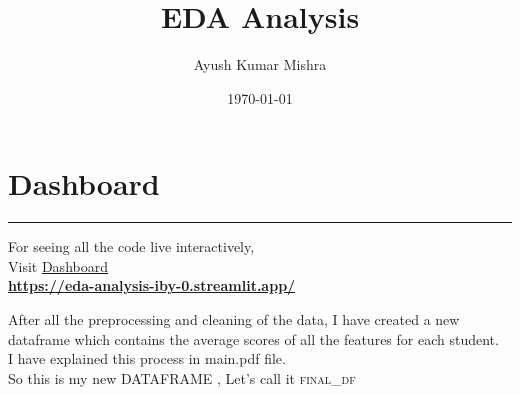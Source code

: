 \documentclass{article}
\title{\textcolor{primaryColor}{\Huge\textbf{EDA Analysis}}}
\author{\textcolor{secondaryColor}{\Large Ayush Kumar Mishra}}
\date{\textcolor{secondaryColor}{\today}}
\begin{document}
\maketitle

\newpage
\section*{Dashboard}
  \begin{center}
        \color{red}\rule{1\linewidth}{1mm}
    \end{center}
\begin{center}
\vspace{2in}
    {\Huge  For seeing all the code live interactively, \\
    \vspace{2in}
    Visit  \href{https://eda-analysis-iby-0.streamlit.app/}{Dashboard}}\\
    
    \vspace{0.7in}
   \textbf{ \href{https://eda-analysis-iby-0.streamlit.app/}{https://eda-analysis-iby-0.streamlit.app/}}
\end{center}

\newpage
\tableofcontents



\newpage
\large

After all the preprocessing and cleaning of the data, I have created a new dataframe which contains the average scores of all the features for each student.\\
I have explained this process in main.pdf file.\\
So this is my new DATAFRAME , Let's call it \textsc{final\_df}
\end{document}
